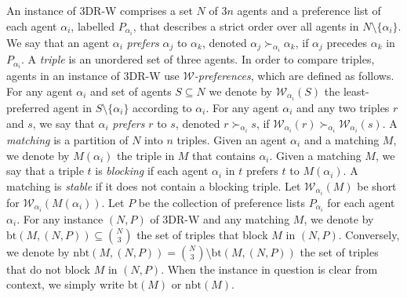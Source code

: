 An instance of 3DR-W comprises a set $N$ of $3n$ agents and a preference list of each agent $\alpha_i$, labelled $P_{\alpha_i}$, that describes a strict order over all agents in $N \setminus \{ \alpha_i \}$. We say that an agent $\alpha_i$ \emph{prefers} $\alpha_j$ to $\alpha_k$, denoted $\alpha_j \succ_{\alpha_i} \alpha_k$, if $\alpha_j$ precedes $\alpha_k$ in $P_{\alpha_i}$.  A \emph{triple} is an unordered set of three agents. In order to compare triples, agents in an instance of 3DR-W use \emph{$\mathscr{W}$-preferences}, which are defined as follows. For any agent $\alpha_i$ and set of agents $S \subseteq N$ we denote by $\mathscr{W}_{\alpha_i}(S)$ the least-preferred agent in $S \setminus \{ \alpha_i \}$ according to $\alpha_i$. For any agent $\alpha_i$ and any two triples $r$ and $s$, we say that $\alpha_i$ \emph{prefers} $r$ to $s$, denoted $r \succ_{\alpha_i} s$, if $\mathscr{W}_{\alpha_i}(r) \succ_{\alpha_i} \mathscr{W}_{\alpha_i}(s)$. A \emph{matching} is a partition of $N$ into $n$ triples. Given an agent $\alpha_i$ and a matching $M$, we denote by $M(\alpha_i)$ the triple in $M$ that contains $\alpha_i$. Given a matching $M$, we say that a triple $t$ is \emph{blocking} if each agent $\alpha_i$ in $t$ prefers $t$ to $M(\alpha_i)$. A matching is \emph{stable} if it does not contain a blocking triple. Let $\mathscr{W}_{\alpha_i}(M)$ be short for $\mathscr{W}_{\alpha_i}(M(\alpha_i))$. Let $P$ be the collection of preference lists  $P_{\alpha_i}$ for each agent $\alpha_i$. For any instance $(N, P)$ of 3DR-W and any matching $M$, we denote by $\textrm{bt}(M, (N, P)) \subseteq \binom{N}{3}$ the set of triples that block $M$ in $(N, P)$. Conversely, we denote by $\textrm{nbt}(M, (N, P)) = \binom{N}{3} \setminus \textrm{bt}(M, (N, P))$ the set of triples that do not block $M$ in $(N, P)$. When the instance in question is clear from context, we simply write $\textrm{bt}(M)$ or $\textrm{nbt}(M)$. 

